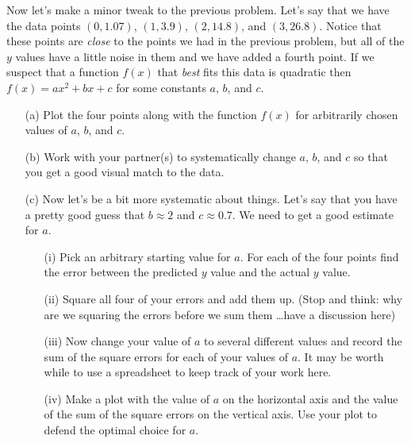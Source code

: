 \begin{problem}
    Now let's make a minor tweak to the previous problem.  Let's say that we have the data
    points $(0,1.07)$, $(1,3.9)$, $(2,14.8)$, and $(3,26.8)$.  Notice that these points
    are {\it close} to the points we had in the previous problem, but all of the $y$
    values have a little noise in them and we have added a fourth point.  If we suspect
    that a function $f(x)$ that {\it best} fits this data is quadratic then $f(x) = ax^2 +
    bx + c$ for some constants $a$, $b$, and $c$.  
    \begin{enumerate}
        \item[(a)] Plot the four points along with the function $f(x)$ for arbitrarily
            chosen values of $a$, $b$, and $c$.  
        \item[(b)] Work with your partner(s) to systematically change $a$, $b$, and $c$ so
            that you get a good visual match to the data.  
        \item[(c)] Now let's be a bit more systematic about things.  Let's say that you
            have a pretty good guess that $b \approx 2$ and $c \approx 0.7$.  We need to
            get a good estimate for $a$.
            \begin{enumerate}
                \item[(i)] Pick an arbitrary starting value for $a$.  For each
                    of the four points find the error between the predicted $y$ value and
                    the actual $y$ value.
                \item[(ii)] Square all four of your errors and add them up.  (Stop and
                    think: why are we squaring the errors before we sum them \ldots have a
                    discussion here)
                \item[(iii)] Now change your value of $a$ to several different values and
                    record the sum of the square errors for each of your values of $a$. It
                    may be worth while to use a spreadsheet to keep track of your work
                    here.
                \item[(iv)] Make a plot with the value of $a$ on the horizontal axis and
                    the value of the sum of the square errors on the vertical axis.  Use
                    your plot to defend the optimal choice for $a$.
            \end{enumerate}
    \end{enumerate}
\end{problem}

